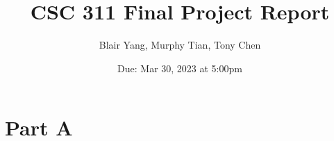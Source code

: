 \documentclass[12pt]{article}
\title{CSC 311 Final Project Report}
\author{Blair Yang, Murphy Tian, Tony Chen} %
\date{Due: Mar 30, 2023 at 5:00pm} %
\begin{document}
\maketitle
\newpage
\section*{Part A}


\end{document}
